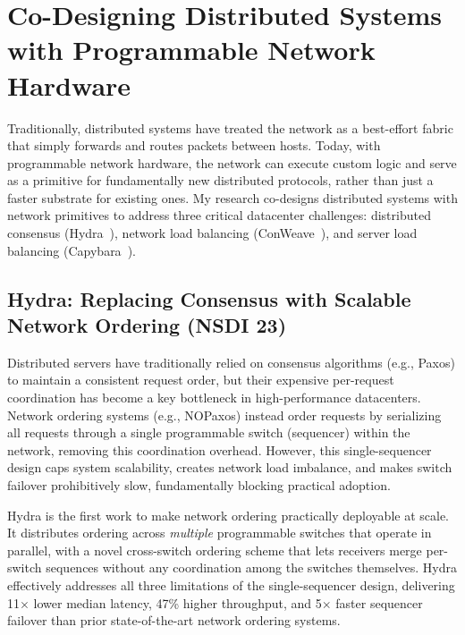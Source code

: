 \documentclass[11pt,letterpaper]{article}
\newcommand{\yr}[1]{\raisebox{0.4ex}{\fontsize{8pt}{8pt}\selectfont\textquotesingle}#1}
\begin{document}
\section{Co-Designing Distributed Systems with Programmable Network Hardware}

Traditionally, distributed systems have treated the network as a best-effort fabric that simply forwards and routes packets between hosts. Today, with programmable network hardware, the network can execute custom logic and serve as a primitive for fundamentally new distributed protocols, rather than just a faster substrate for existing ones. My research co-designs distributed systems with network primitives to address three critical datacenter challenges: distributed consensus (Hydra~\cite{hydra}), network load balancing (ConWeave~\cite{conweave}), and server load balancing (Capybara~\cite{capybara_apsys, capybara_sigcomm}). 

\subsection{Hydra: Replacing Consensus with Scalable Network Ordering (NSDI \yr{23})~\cite{hydra}}
Distributed servers have traditionally relied on consensus algorithms (e.g., Paxos) to maintain a consistent request order, but their expensive per-request coordination has become a key bottleneck in high-performance datacenters.
Network ordering systems (e.g., NOPaxos) instead order requests by serializing all requests through a single programmable switch (sequencer) within the network, removing this coordination overhead.
However, this single-sequencer design caps system scalability, creates network load imbalance, and makes switch failover prohibitively slow, fundamentally blocking practical adoption.

Hydra is the first work to make network ordering practically deployable at scale.
It distributes ordering across \emph{multiple} programmable switches that operate in parallel, with a novel cross-switch ordering scheme that lets receivers merge per-switch sequences without any coordination among the switches themselves.
Hydra effectively addresses all three limitations of the single-sequencer design, delivering 11$\times$ lower median latency, 47\% higher throughput, and 5$\times$ faster sequencer failover than prior state-of-the-art network ordering systems.
\end{document}
